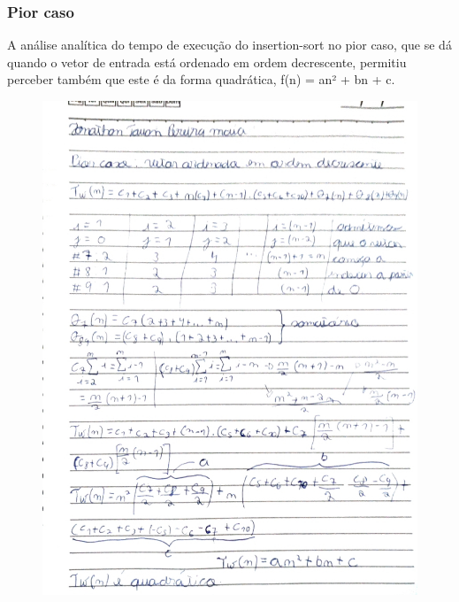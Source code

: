 \newpage

\subsubsection{Pior caso}
A análise analítica do tempo de execução do insertion-sort no pior caso, que se dá quando o vetor de entrada está ordenado em ordem decrescente, permitiu perceber também que este é da forma quadrática, f(n) = an² +
bn + c.
\begin{figure}[h]
    \centering
    \includegraphics[width=0.76\linewidth]{Imagens/pior-insertion.jpg}
\end{figure}
